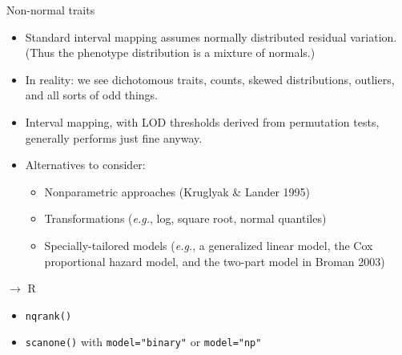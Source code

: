 \documentclass[12pt]{article}
\newcommand{\headsize}{\fontsize{35}{35} \selectfont}
\newcommand{\smallsize}{\fontsize{25}{30} \selectfont}
\newcommand{\smallersize}{\fontsize{20}{25} \selectfont}
\begin{document}
\newpage

\headsize \color{myyellow}
\hfill \begin{minipage}{5.75in}
\centering
Non-normal traits
\end{minipage}


\vspace{25mm}

\color{mywhite} \smallersize
\hfill \begin{minipage}{10in}
\begin{itemize}
\setlength{\rightskip}{0pt plus 1fil} %
\itemsep18pt
\item Standard interval mapping assumes normally distributed residual
variation.  (Thus the phenotype distribution is a mixture of normals.)
\item {\color{mypink} In reality}: we see dichotomous traits,
counts, skewed distributions, outliers, and all sorts of odd things.
\item Interval mapping, with LOD thresholds derived from permutation
tests, generally performs just fine anyway.
\item Alternatives to consider:
\begin{itemize}
\smallersize
\setlength{\rightskip}{0pt plus 1fil} %
    \item Nonparametric approaches {\color{myblue} (Kruglyak \& Lander 1995)}
    \item Transformations {\color{myblue} (\emph{e.g.}, log, square root, normal quantiles)}
    \item Specially-tailored models  {\color{myblue} (\emph{e.g.}, a generalized linear
    model, the Cox proportional hazard model, and the two-part model
    in Broman 2003)}
\end{itemize}
\end{itemize} \end{minipage}




\newpage

\headsize \color{myyellow}
$\boldsymbol{\rightarrow}$ R

\vspace{3cm}

\color{mywhite} \smallsize

\hfill \begin{minipage}[t]{9.5in}
\begin{itemize}
\itemsep24pt
\item \verb|nqrank()|
\item \verb|scanone()| with \verb|model="binary"| or \verb|model="np"|
\end{itemize} \end{minipage}
\end{document}
